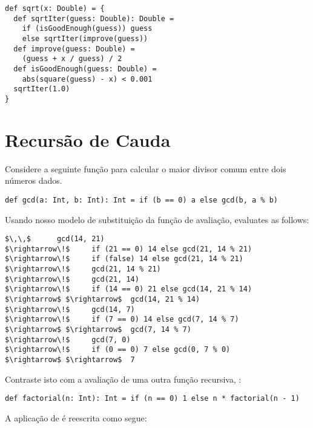 \begin{lstlisting}
def sqrt(x: Double) = {
  def sqrtIter(guess: Double): Double =
    if (isGoodEnough(guess)) guess
    else sqrtIter(improve(guess))
  def improve(guess: Double) =
    (guess + x / guess) / 2
  def isGoodEnough(guess: Double) =
    abs(square(guess) - x) < 0.001
  sqrtIter(1.0)
}
\end{lstlisting}


\section{Recurs\~{a}o de Cauda}

Considere a seguinte fun\c{c}\~{a}o para calcular o maior divisor comum entre
dois n\'{u}meros dados.

\begin{lstlisting}
def gcd(a: Int, b: Int): Int = if (b == 0) a else gcd(b, a % b)
\end{lstlisting}

Usando nosso modelo de substitui\c{c}\~{a}o da fun\c{c}\~{a}o de avalia\c{c}\~{a}o,
 evaluates as follows:

\begin{lstlisting}
$\,\,$      gcd(14, 21)  
$\rightarrow\!$     if (21 == 0) 14 else gcd(21, 14 % 21)
$\rightarrow\!$     if (false) 14 else gcd(21, 14 % 21)
$\rightarrow\!$     gcd(21, 14 % 21)
$\rightarrow\!$     gcd(21, 14)
$\rightarrow\!$     if (14 == 0) 21 else gcd(14, 21 % 14)
$\rightarrow$ $\rightarrow$  gcd(14, 21 % 14)
$\rightarrow\!$     gcd(14, 7)
$\rightarrow\!$     if (7 == 0) 14 else gcd(7, 14 % 7)
$\rightarrow$ $\rightarrow$  gcd(7, 14 % 7)
$\rightarrow\!$     gcd(7, 0)
$\rightarrow\!$     if (0 == 0) 7 else gcd(0, 7 % 0)
$\rightarrow$ $\rightarrow$  7
\end{lstlisting}

Contraste isto com a avalia\c{c}\~{a}o de uma outra fun\c{c}\~{a}o recursiva,
:

\begin{lstlisting}
def factorial(n: Int): Int = if (n == 0) 1 else n * factorial(n - 1)
\end{lstlisting}

A aplica\c{c}\~{a}o de  \'{e} reescrita como segue: 

